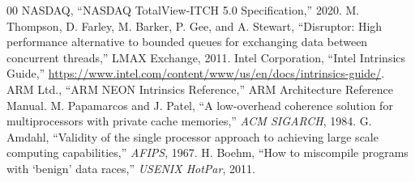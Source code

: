 \documentclass[conference]{IEEEtran}
\begin{document}
\begin{thebibliography}{00}
 NASDAQ, ``NASDAQ TotalView-ITCH 5.0 Specification,'' 2020.
 M. Thompson, D. Farley, M. Barker, P. Gee, and A. Stewart, ``Disruptor: High performance alternative to bounded queues for exchanging data between concurrent threads,'' LMAX Exchange, 2011.
 Intel Corporation, ``Intel Intrinsics Guide,'' \url{https://www.intel.com/content/www/us/en/docs/intrinsics-guide/}.
 ARM Ltd., ``ARM NEON Intrinsics Reference,'' ARM Architecture Reference Manual.
 M. Papamarcos and J. Patel, ``A low-overhead coherence solution for multiprocessors with private cache memories,'' \textit{ACM SIGARCH}, 1984.
 G. Amdahl, ``Validity of the single processor approach to achieving large scale computing capabilities,'' \textit{AFIPS}, 1967.
 H. Boehm, ``How to miscompile programs with `benign' data races,'' \textit{USENIX HotPar}, 2011.
\end{thebibliography}
\end{document}
